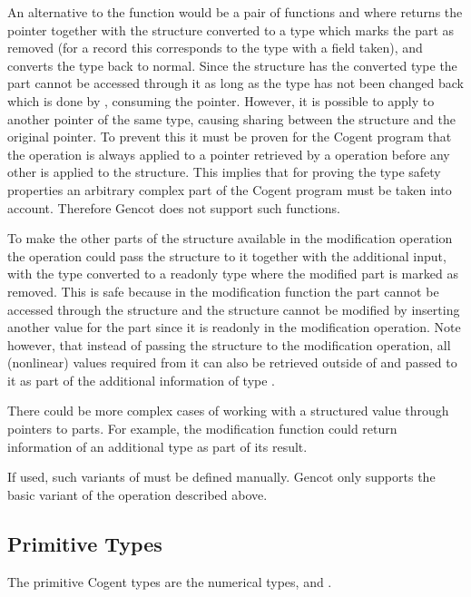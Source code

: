 An alternative to the function  would be a pair of functions  and  where 
returns the pointer together with the structure converted to a type which marks the part as removed (for a record this
corresponds to the type with a field taken), and  converts the type back to normal. 
Since the structure has the converted type the part cannot be accessed through it
as long as the type has not been changed back which is done by , consuming the pointer.
However, it is possible to apply  to another pointer of the same type, causing sharing between the 
structure and the original pointer. To prevent this it must be proven for the Cogent program that the 
operation is always applied to a pointer retrieved by a  operation before any other 
is applied to the structure. This implies that
for proving the type safety properties an arbitrary complex part of the Cogent program must be taken into
account. Therefore Gencot does not support such functions.

To make the other parts of the structure available in the modification operation the  operation could
pass the structure to it together with the additional input, with the type converted to a readonly type where the modified
part is marked as removed. This is safe because in the modification function the part cannot be accessed
through the structure and the structure cannot be modified by inserting another value for the part since it is
readonly in the modification operation. Note however, that instead of passing the structure to the modification operation,
all (nonlinear) values required from it can also be retrieved outside of  and passed to it as part of the 
additional information of type .

There could be more complex cases of working with a structured value through pointers to parts. For example, the 
modification function could return information of an additional type  as part of its result.

If used, such variants of  must be defined manually. Gencot only supports the basic variant of the 
 operation described above.

\subsection{Primitive Types}
\label{design-operations-prim}

The primitive Cogent types are the numerical types,  and . 

